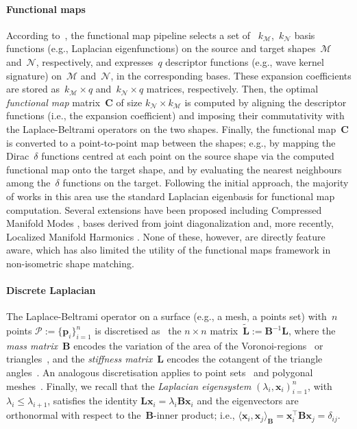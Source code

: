 \documentclass[acmtog,authorversion]{acmart}
\newcommand{\M}{\mathcal{M}}
\newcommand{\N}{\mathcal{N}}
\begin{document}
\paragraph*{Functional maps}
According to~\citep{OVSJANIKOV2012,OVSJANIKOV2017-STAR}, the functional map pipeline selects a set of ~$k_\M$,~$k_\N$ basis functions (e.g., Laplacian eigenfunctions) on the source and target shapes~$\M$ and~$\N$, respectively, and expresses~$q$ descriptor functions (e.g., wave kernel signature) on~$\mathcal{M}$ and~$\mathcal{N}$, in the corresponding bases. These expansion coefficients are stored as~$k_\M \times q$ and~$k_\N \times q$ matrices, respectively. Then, the optimal \emph{functional map} matrix~$\mathbf{C}$ of size \mbox{$k_\N \times k_\M$} is computed by aligning the descriptor functions (i.e., the expansion coefficient) and imposing their commutativity with the Laplace-Beltrami operators on the two shapes. Finally, the functional map~$\mathbf{C}$ is converted to a point-to-point map between the shapes; e.g., by mapping the Dirac~$\delta$ functions centred at each point on the source shape via the computed functional map onto the target shape, and by evaluating the nearest neighbours among the~$\delta$ functions on the target. 
Following the initial approach, the majority of works in this area use the standard Laplacian
eigenbasis for functional map computation. Several extensions have been proposed including
Compressed Manifold Modes \citep{NEUMANN2014}, bases derived from joint diagonalization
\citep{KONVATSKY2013}  and, more recently, Localized Manifold Harmonics
\citep{melzi2017localized}. None of these, however, are directly feature aware, which has also
limited the utility of the functional maps framework in non-isometric shape matching.
\newpage

\paragraph*{Discrete Laplacian}
The Laplace-Beltrami operator on a surface (e.g., a mesh, a points set) with~$n$ points \mbox{$\mathcal{P}:=\{\mathbf{p}_{i}\}_{i=1}^{n}$} is discretised as~ the \mbox{$n\times n$} matrix~$\mbox{$\tilde{\mathbf{L}}:=\mathbf{B}^{-1}\mathbf{L}$}$, where the \emph{mass matrix}~$\mathbf{B}$ encodes the variation of the area of the Voronoi-regions~\citep{DESBRUN1999} or triangles~\citep{reuter:cad06}, and the \emph{stiffness matrix}~$\mathbf{L}$ encodes the cotangent of the triangle angles~\citep{PINKALL1993}. An analogous discretisation applies to point sets~\citep{BELKIN2003,LIU2012} and polygonal meshes~\citep{ALEXA2011,HERHOLZ2015}. Finally, we recall that the \emph{Laplacian eigensystem} \mbox{$(\lambda_{i},\mathbf{x}_{i})_{i=1}^{n}$}, with \mbox{$\lambda_{i}\leq\lambda_{i+1}$}, satisfies the identity \mbox{$\mathbf{L}\mathbf{x}_{i}=\lambda_{i}\mathbf{B}\mathbf{x}_{i}$} and the eigenvectors are orthonormal with respect to the~$\mathbf{B}$-inner product; i.e., \mbox{$\langle\mathbf{x}_{i},\mathbf{x}_{j}\rangle_{\mathbf{B}}=\mathbf{x}_{i}^{\top}\mathbf{B}\mathbf{x}_{j}=\delta_{ij}$}.
\end{document}
